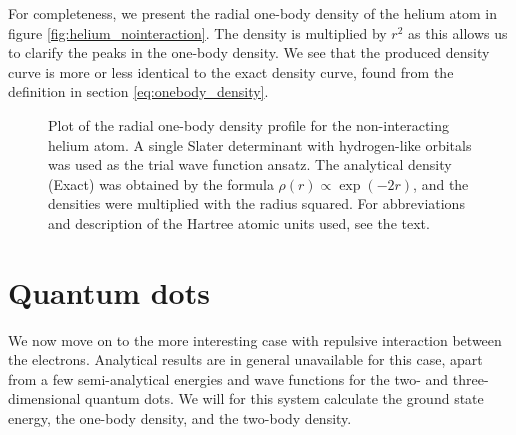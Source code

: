 For completeness, we present the radial one-body density of the helium atom in figure \eqref{fig:helium_nointeraction}. The density is multiplied by $r^2$ as this allows us to clarify the peaks in the one-body density. We see that the produced density curve is more or less identical to the exact density curve, found from the definition in section \ref{eq:onebody_density}.

\begin{figure}[H]
	\centering
	\captionsetup[subfigure]{labelformat=empty}
	\caption{Plot of the radial one-body density profile for the non-interacting helium atom. A single Slater determinant with hydrogen-like orbitals was used as the trial wave function ansatz. The analytical density (Exact) was obtained by the formula $\rho(r)\propto\exp(-2r)$, and the densities were multiplied with the radius squared. For abbreviations and description of the Hartree atomic units used, see the text.}
	\label{fig:helium_nointeraction}
\end{figure}

\cleardoublepage
\section{Quantum dots} \label{sec:quantumdotresults}
We now move on to the more interesting case with repulsive interaction between the electrons. Analytical results are in general unavailable for this case, apart from a few semi-analytical energies and wave functions for the two- and three-dimensional quantum dots. We will for this system calculate the ground state energy, the one-body density, and the two-body density. 

